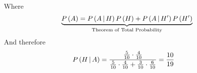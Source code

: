 \documentclass[14pt,fleqn]{extarticle}
\begin{document}
\begin{problem}
\begin{step}
        Where 
        \[\underbrace{P\left( A\right) = P\left(A\,\vert\,H\right)P\left( H\right) + P\left(A\,\vert\,H'\right)P\left( H'\right)}_{\text{Theorem of Total Probability}} \]
        And therefore
        \begin{align}
          P\left(H\,\vert\,A\right) &= \dfrac{\frac{5}{10}\cdot\frac{4}{10}}
          {\frac{5}{10}\cdot\frac{4}{10} + \frac{3}{10}\cdot\frac{6}{10} } = \dfrac{10}{19}
        \end{align}    
\end{step}
\end{problem}
\end{document}
